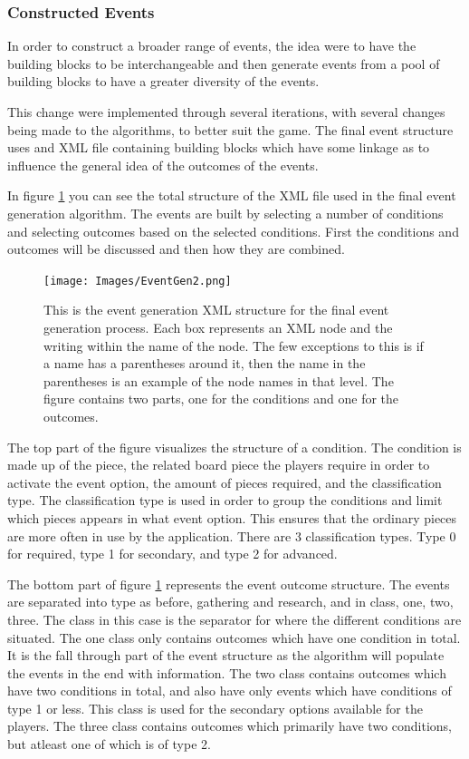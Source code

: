 \subsubsection{Constructed Events}
In order to construct a broader range of events, the idea were to have the building blocks to be interchangeable and then generate events from a pool of building blocks to have a greater diversity of the events.

This change were implemented through several iterations, with several changes being made to the algorithms, to better suit the game. The final event structure uses and XML file containing building blocks which have some linkage as to influence the general idea of the outcomes of the events.

In figure \ref{fig:eGen2} you can see the total structure of the XML file used in the final event generation algorithm. 
The events are built by selecting a number of conditions and selecting outcomes based on the selected conditions. 
First the conditions and outcomes will be discussed and then how they are combined.

\begin{figure}[h]
    \centering
    \texttt{[image: Images/EventGen2.png]}
    \caption{This is the event generation XML structure for the final event generation process. Each box represents an XML node and the writing within the name of the node. The few exceptions to this is if a name has a parentheses around it, then the name in the parentheses is an example of the node names in that level. The figure contains two parts, one for the conditions and one for the outcomes.}
    \label{fig:eGen2}
\end{figure}

The top part of the figure visualizes the structure of a condition. The condition is made up of the piece, the related board piece the players require in order to activate the event option, the amount of pieces required, and the classification type.
The classification type is used in order to group the conditions and limit which pieces appears in what event option. This ensures that the ordinary pieces are more often in use by the application. There are 3 classification types. Type 0 for required, type 1 for secondary, and type 2 for advanced.

The bottom part of figure \ref{fig:eGen2} represents the event outcome structure. The events are separated into type as before, gathering and research, and in class, one, two, three. 
The class in this case is the separator for where the different conditions are situated. The one class only contains outcomes which have one condition in total. It is the fall through part of the event structure as the algorithm will populate the events in the end with information.
The two class contains outcomes which have two conditions in total, and also have only events which have conditions of type 1 or less. 
This class is used for the secondary options available for the players.
The three class contains outcomes which primarily have two conditions, but atleast one of which is of type 2.

